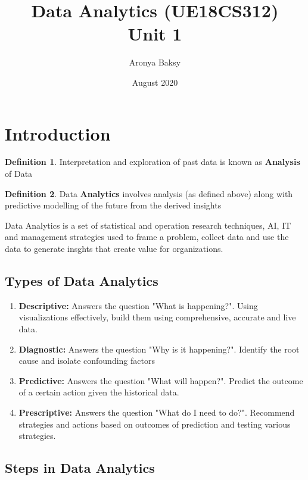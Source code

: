 \documentclass{article}
\title{Data Analytics (UE18CS312)\\
\large Unit 1}
\author{Aronya Baksy}
\date{August 2020}
\theoremstyle{plain}
\theoremstyle{definition}
\newtheorem{defn}{Definition} %
\begin{document}
\maketitle

\section{Introduction}

\begin{defn}
    Interpretation and exploration of past data is known as \textbf{Analysis} of Data
\end{defn}

\begin{defn}
    Data \textbf{Analytics} involves analysis (as defined above) along with predictive modelling of the future from the derived insights
\end{defn}

Data Analytics is a set of statistical and operation research techniques, AI, IT and management strategies used to frame a problem, collect data and use the data to generate insghts that create value for organizations. 

\subsection{Types of Data Analytics}

\begin{enumerate}
    \item \textbf{Descriptive:} Answers the question "What is happening?". Using visualizations effectively, build them using comprehensive, accurate and live data.
    
    \item \textbf{Diagnostic:} Answers the question "Why is it happening?". Identify the root cause and isolate confounding factors
    
    \item \textbf{Predictive:} Answers the question "What will happen?". Predict the outcome of a certain action given the historical data.
    
    \item \textbf{Prescriptive:} Answers the question "What do I need to do?". Recommend strategies and actions based on outcomes of prediction and testing various strategies. 
\end{enumerate}

\subsection{Steps in Data Analytics}
\end{document}
